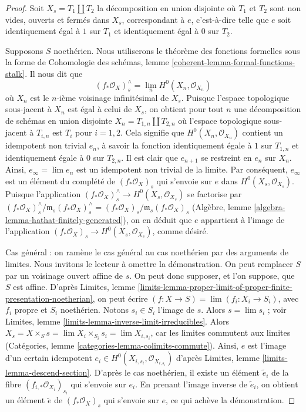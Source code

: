 \begin{proof}
Soit $X_s = T_1 \amalg T_2$ la décomposition en union disjointe
où $T_1$ et $T_2$ sont non vides, ouverts et fermés dans $X_s$,
correspondant à $e$, c'est-à-dire telle que $e$ soit identiquement égal à $1$
sur $T_1$ et identiquement égal à $0$ sur $T_2$.

\medskip\noindent
Supposons $S$ noethérien. Nous utiliserons le théorème des fonctions formelles
sous la forme de Cohomologie des schémas, lemme
\ref{coherent-lemma-formal-functions-stalk}.
Il nous dit que
$$
(f_*\mathcal{O}_X)_s^\wedge = \lim_n H^0(X_n, \mathcal{O}_{X_n})
$$
où $X_n$ est le $n$-ième voisinage infinitésimal de $X_s$.
Puisque l'espace topologique sous-jacent à $X_n$ est égal à celui
de $X_s$, on obtient pour tout $n $ une décomposition de schémas en union disjointe
$X_n = T_{1, n} \amalg T_{2, n}$ où l'espace topologique sous-jacent
à $T_{i, n}$ est $T_i$ pour $i = 1, 2$. Cela signifie que
$H^0(X_n, \mathcal{O}_{X_n})$ contient un idempotent non trivial $e_n$,
à savoir la fonction identiquement égale à $1$ sur $T_{1, n}$ et
identiquement égale à $0$ sur $T_{2, n}$. Il est clair que $e_{n + 1}$
se restreint en $e_n$ sur $X_n$. Ainsi, $e_\infty = \lim e_n$
est un idempotent non trivial de la limite. Par conséquent, $e_\infty$
est un élément du complété de $(f_*\mathcal{O}_X)_s$
qui s'envoie sur $e$ dans $H^0(X_s, \mathcal{O}_{X_s})$.
Puisque l'application $(f_*\mathcal{O}_X)_s^\wedge \to H^0(X_s, \mathcal{O}_{X_s})$
se factorise par
$(f_*\mathcal{O}_X)^\wedge_s / \mathfrak m_s (f_*\mathcal{O}_X)_s^\wedge =
(f_*\mathcal{O}_X)_s / \mathfrak m_s (f_*\mathcal{O}_X)_s$
(Algèbre, lemme \ref{algebra-lemma-hathat-finitely-generated}),
on en déduit que $e$ appartient à l'image de
l'application $(f_*\mathcal{O}_X)_s \to H^0(X_s, \mathcal{O}_{X_s})$,
comme désiré.

\medskip\noindent
Cas général : on ramène le cas général au cas noethérien par des
arguments de limites. Nous invitons le lecteur à omettre la démonstration.
On peut remplacer $S$ par un voisinage ouvert affine de $s$.
On peut donc supposer, et l'on suppose, que $S$ est affine. D'après Limites, lemme
\ref{limits-lemma-proper-limit-of-proper-finite-presentation-noetherian},
on peut écrire $(f : X \to S) = \lim (f_i : X_i \to S_i)$, avec $f_i$
propre et $S_i$ noethérien. Notons $s_i \in S_i$ l'image de $s$.
Alors $s = \lim s_i$ ; voir
Limites, lemme \ref{limits-lemma-inverse-limit-irreducibles}.
Alors $X_s = X \times_S s = \lim X_i \times_{S_i} s_i = \lim X_{i, s_i}$,
car les limites commutent aux limites
(Catégories, lemme \ref{categories-lemma-colimits-commute}).
Ainsi, $e$ est l'image d'un certain idempotent
$e_i \in H^0(X_{i, s_i}, \mathcal{O}_{X_{i, s_i}})$
d'après Limites, lemme \ref{limits-lemma-descend-section}.
D'après le cas noethérien, il existe un élément $\tilde e_i$
de la fibre $(f_{i, *}\mathcal{O}_{X_i})_{s_i}$ qui s'envoie
sur $e_i$. En prenant l'image inverse de $\tilde e_i$, on obtient un
élément $\tilde e$ de $(f_*\mathcal{O}_X)_s$ qui s'envoie
sur $e$, ce qui achève la démonstration.
\end{proof}

